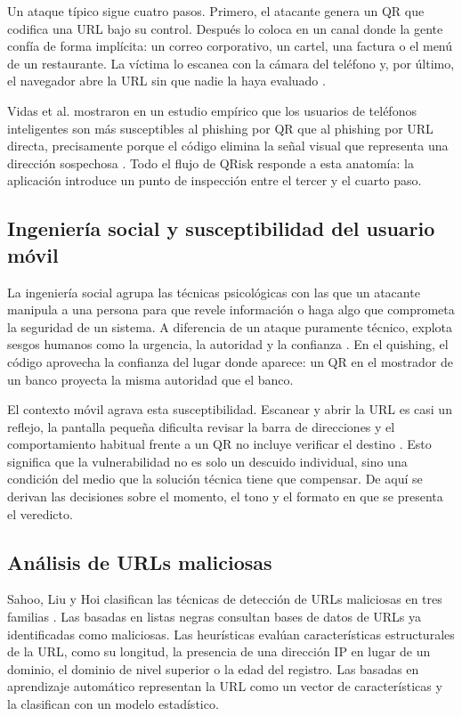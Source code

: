 Un ataque típico sigue cuatro pasos. Primero, el atacante genera un QR que codifica una URL bajo su control. Después lo coloca en un canal donde la gente confía de forma implícita: un correo corporativo, un cartel, una factura o el menú de un restaurante. La víctima lo escanea con la cámara del teléfono y, por último, el navegador abre la URL sin que nadie la haya evaluado \cite{vidas2013qrishing}.

Vidas et al. mostraron en un estudio empírico que los usuarios de teléfonos inteligentes son más susceptibles al phishing por QR que al phishing por URL directa, precisamente porque el código elimina la señal visual que representa una dirección sospechosa \cite{vidas2013qrishing}. Todo el flujo de QRisk responde a esta anatomía: la aplicación introduce un punto de inspección entre el tercer y el cuarto paso.

\subsection{Ingeniería social y susceptibilidad del usuario móvil}

La ingeniería social agrupa las técnicas psicológicas con las que un atacante manipula a una persona para que revele información o haga algo que comprometa la seguridad de un sistema. A diferencia de un ataque puramente técnico, explota sesgos humanos como la urgencia, la autoridad y la confianza \cite{salahdine2019social}. En el quishing, el código aprovecha la confianza del lugar donde aparece: un QR en el mostrador de un banco proyecta la misma autoridad que el banco.

El contexto móvil agrava esta susceptibilidad. Escanear y abrir la URL es casi un reflejo, la pantalla pequeña dificulta revisar la barra de direcciones y el comportamiento habitual frente a un QR no incluye verificar el destino \cite{vidas2013qrishing,krombholz2014qr}. Esto significa que la vulnerabilidad no es solo un descuido individual, sino una condición del medio que la solución técnica tiene que compensar. De aquí se derivan las decisiones sobre el momento, el tono y el formato en que se presenta el veredicto.

\subsection{Análisis de URLs maliciosas}

Sahoo, Liu y Hoi clasifican las técnicas de detección de URLs maliciosas en tres familias \cite{sahoo2017malicious}. Las basadas en listas negras consultan bases de datos de URLs ya identificadas como maliciosas. Las heurísticas evalúan características estructurales de la URL, como su longitud, la presencia de una dirección IP en lugar de un dominio, el dominio de nivel superior o la edad del registro. Las basadas en aprendizaje automático representan la URL como un vector de características y la clasifican con un modelo estadístico.

